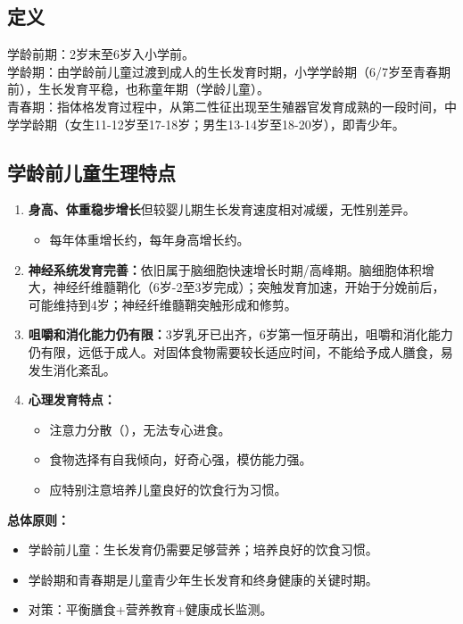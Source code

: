 \subsection{定义}

\begin{tipbox}
学龄前期：2岁末至6岁入小学前。\\
学龄期：由学龄前儿童过渡到成人的生长发育时期，小学学龄期（6/7岁至青春期前），生长发育平稳，也称童年期（学龄儿童）。\\
青春期：指体格发育过程中，从第二性征出现至生殖器官发育成熟的一段时间，中学学龄期（女生11-12岁至17-18岁；男生13-14岁至18-20岁），即青少年。
\end{tipbox}

\subsection{学龄前儿童生理特点}

\begin{keybox}
\begin{enumerate}[leftmargin=*]
    \item \textbf{身高、体重稳步增长}但较婴儿期生长发育速度相对减缓，无性别差异。
    \begin{itemize}[leftmargin=*]
        \item 每年体重增长约，每年身高增长约。
    \end{itemize}

    \item \textbf{神经系统发育完善：}依旧属于脑细胞快速增长时期/高峰期。脑细胞体积增大，神经纤维髓鞘化（6岁-2至3岁完成）；突触发育加速，开始于分娩前后，可能维持到4岁；神经纤维髓鞘突触形成和修剪。

    \item \textbf{咀嚼和消化能力仍有限：}3岁乳牙已出齐，6岁第一恒牙萌出，咀嚼和消化能力仍有限，远低于成人。对固体食物需要较长适应时间，不能给予成人膳食，易发生消化紊乱。

    \item \textbf{心理发育特点：}
    \begin{itemize}[leftmargin=*]
        \item 注意力分散（），无法专心进食。
        \item 食物选择有自我倾向，好奇心强，模仿能力强。
        \item 应特别注意培养儿童良好的饮食行为习惯。
    \end{itemize}
\end{enumerate}

\textbf{总体原则：}
\begin{itemize}[leftmargin=*]
    \item 学龄前儿童：生长发育仍需要足够营养；培养良好的饮食习惯。
    \item 学龄期和青春期是儿童青少年生长发育和终身健康的关键时期。
    \item 对策：平衡膳食+营养教育+健康成长监测。
\end{itemize}
\end{keybox}

